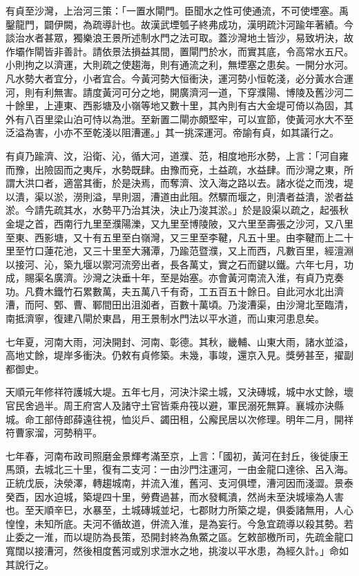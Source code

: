 有貞至沙灣，上治河三策：「一置水閘門。臣聞水之性可使通流，不可使堙塞。禹鑿龍門，闢伊闕，為疏導計也。故漢武堙瓠子終弗成功，漢明疏汴河踰年著績。今談治水者甚眾，獨樂浪王景所述制水門之法可取。蓋沙灣地土皆沙，易致坍決，故作壩作閘皆非善計。請依景法損益其間，置閘門於水，而實其底，令高常水五尺。小則拘之以濟運，大則疏之使趨海，則有通流之利，無堙塞之患矣。一開分水河。凡水勢大者宜分，小者宜合。今黃河勢大恒衝決，運河勢小恒乾淺，必分黃水合運河，則有利無害。請度黃河可分之地，開廣濟河一道，下穿濮陽、博陵及舊沙河二十餘里，上連東、西影塘及小嶺等地又數十里，其內則有古大金堤可倚以為固，其外有八百里梁山泊可恃以為泄。至新置二閘亦頗堅牢，可以宣節，使黃河水大不至泛溢為害，小亦不至乾淺以阻漕運。」其一挑深運河。帝諭有貞，如其議行之。

有貞乃踰濟、汶，沿衛、沁，循大河，道濮、范，相度地形水勢，上言：「河自雍而豫，出險固而之夷斥，水勢既肆。由豫而兗，土益疏，水益肆。而沙灣之東，所謂大洪口者，適當其衝，於是決焉，而奪濟、汶入海之路以去。諸水從之而洩，堤以潰，渠以淤，澇則溢，旱則涸，漕道由此阻。然驟而堰之，則潰者益潰，淤者益淤。今請先疏其水，水勢平乃治其決，決止乃浚其淤。」於是設渠以疏之，起張秋金堤之首，西南行九里至濮陽濼，又九里至博陵陂，又六里至壽張之沙河，又八里至東、西影塘，又十有五里至白嶺灣，又三里至李鞬，凡五十里。由李鞬而上二十里至竹口蓮花池，又三十里至大瀦潭，乃踰范暨濮，又上而西，凡數百里，經澶淵以接河、沁，築九堰以禦河流旁出者，長各萬丈，實之石而鍵以鐵。六年七月，功成，賜渠名廣濟。沙灣之決垂十年，至是始塞。亦會黃河南流入淮，有貞乃克奏功。凡費木鐵竹石累數萬，夫五萬八千有奇，工五百五十餘日。自此河水北出濟漕，而阿、鄄、曹、鄆間田出沮洳者，百數十萬頃。乃浚漕渠，由沙灣北至臨清，南抵濟寧，復建八閘於東昌，用王景制水門法以平水道，而山東河患息矣。

七年夏，河南大雨，河決開封、河南、彰德。其秋，畿輔、山東大雨，諸水並溢，高地丈餘，堤岸多衝決。仍敕有貞修築。未幾，事竣，還京入見。獎勞甚至，擢副都御史。

天順元年修祥符護城大堤。五年七月，河決汴梁土城，又決磚城，城中水丈餘，壞官民舍過半。周王府宮人及諸守土官皆乘舟筏以避，軍民溺死無算。襄城亦決縣城。命工部侍郎薛遠往視，恤災戶、蠲田租，公廨民居以次修理。明年二月，開祥符曹家溜，河勢稍平。

七年春，河南布政司照磨金景輝考滿至京，上言：「國初，黃河在封丘，後徙康王馬頭，去城北三十里，復有二支河：一由沙門注運河，一由金龍口達徐、呂入海。正統戊辰，決滎澤，轉趨城南，并流入淮，舊河、支河俱堙，漕河因而淺澀。景泰癸酉，因水迫城，築堤四十里，勞費過甚，而水發輒潰，然尚未至決城壕為人害也。至天順辛巳，水暴至，土城磚城並圮，七郡財力所築之堤，俱委諸無用，人心惶惶，未知所底。夫河不循故道，併流入淮，是為妄行。今急宜疏導以殺其勢。若止委之一淮，而以堤防為長策，恐開封終為魚鱉之區。乞敕部檄所司，先疏金龍口寬闊以接漕河，然後相度舊河或別求泄水之地，挑浚以平水患，為經久計。」命如其說行之。

